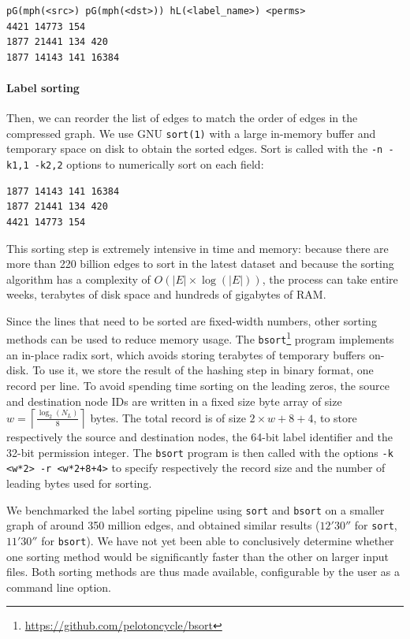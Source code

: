 \begin{verbatim}
pG(mph(<src>) pG(mph(<dst>)) hL(<label_name>) <perms>
4421 14773 154
1877 21441 134 420
1877 14143 141 16384
\end{verbatim}

\paragraph{Label sorting}
Then, we can reorder the list of edges to match the order of edges in the
compressed graph.
We use GNU \texttt{sort(1)} with a large in-memory buffer and temporary
space on disk to obtain the sorted edges. Sort is called with the \texttt{-n
-k1,1 -k2,2} options to numerically sort on each field:

\begin{verbatim}
1877 14143 141 16384
1877 21441 134 420
4421 14773 154
\end{verbatim}

This sorting step is extremely intensive in time and memory: because there are
more than 220 billion edges to sort in the latest dataset and because the
sorting algorithm has a complexity of $O(|E| \times \log(|E|))$, the process
can take entire weeks, terabytes of disk space and hundreds of gigabytes of
RAM\@.

Since the lines that need to be sorted are fixed-width numbers, other
sorting methods can be used to reduce memory usage. The
\texttt{bsort}\footnote{\url{https://github.com/pelotoncycle/bsort}} program
implements an in-place radix sort, which avoids storing terabytes of temporary
buffers on-disk. To use it, we store the result of the hashing step in binary
format, one record per line. To avoid spending time sorting on the leading
zeros, the source and destination node IDs are written in a fixed size byte
array of size $w = \left\lceil{\frac{\log_2(N_L)}{8}}\right\rceil$ bytes. The
total record is of size $2 \times w + 8 + 4$, to store respectively the source
and destination nodes, the 64-bit label identifier and the 32-bit permission
integer. The \texttt{bsort} program is then called with the options \texttt{-k
<w*2> -r <w*2+8+4>} to specify respectively the record size and the number of
leading bytes used for sorting.

We benchmarked the label sorting pipeline using \texttt{sort} and
\texttt{bsort} on a smaller graph of around 350 million edges, and obtained
similar results ($12'30''$ for \texttt{sort}, $11'30''$ for \texttt{bsort}).
We have not yet been able to conclusively determine whether one sorting method
would be significantly faster than the other on larger input files. Both
sorting methods are thus made available, configurable by the user as a command
line option.

